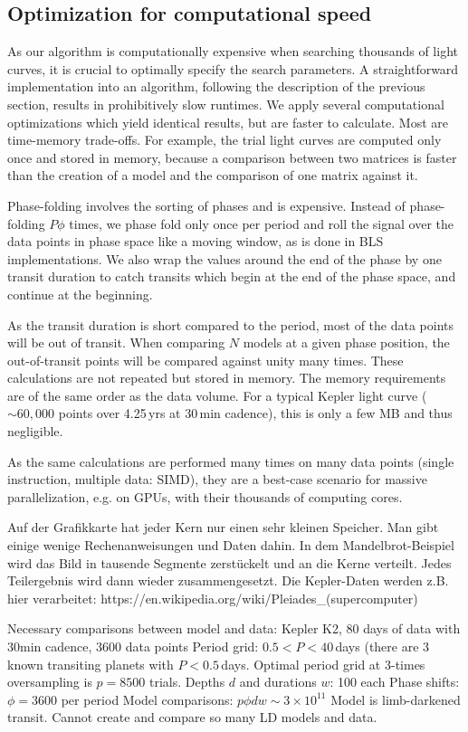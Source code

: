 \documentclass[twocolumn,tighten,longauthor]{myaastex62}
\begin{document}
\subsection{Optimization for computational speed}
As our algorithm is computationally expensive when searching thousands of light curves, it is crucial to optimally specify the search parameters.
A straightforward implementation into an algorithm, following the description of the previous section, results in prohibitively slow runtimes. We apply several computational optimizations which yield identical results, but are faster to calculate. Most are time-memory trade-offs. For example, the trial light curves are computed only once and stored in memory, because a comparison between two matrices is faster than the creation of a model and the comparison of one matrix against it.

Phase-folding involves the sorting of phases and is expensive. Instead of phase-folding $P \phi$ times, we phase fold only once per period and roll the signal over the data points in phase space like a moving window, as is done in BLS implementations. We also wrap the values around the end of the phase by one transit duration to catch transits which begin at the end of the phase space, and continue at the beginning.

As the transit duration is short compared to the period, most of the data points will be out of transit. When comparing $N$ models at a given phase position, the out-of-transit points will be compared against unity many times. These calculations are not repeated but stored in memory. The memory requirements are of the same order as the data volume. For a typical Kepler light curve ($\sim60{,}000$ points over 4.25\,yrs at 30\,min cadence), this is only a few MB and thus negligible.

As the same calculations are performed many times on many data points (single instruction, multiple data: SIMD), they are a best-case scenario for massive parallelization, e.g. on GPUs, with their thousands of computing cores.

Auf der Grafikkarte hat jeder Kern nur einen sehr kleinen Speicher. Man gibt einige wenige Rechenanweisungen und Daten dahin. In dem Mandelbrot-Beispiel wird das Bild in tausende Segmente zerstückelt und an die Kerne verteilt. Jedes Teilergebnis wird dann wieder zusammengesetzt.
Die Kepler-Daten werden z.B. hier verarbeitet: https://en.wikipedia.org/wiki/Pleiades_(supercomputer)

Necessary comparisons between model and data:
Kepler K2, 80 days of data with 30min cadence, 3600 data points
Period grid: $0.5<P<40\,$days (there are 3 known transiting planets with $P<0.5\,$days. Optimal period grid at 3-times oversampling is $p=8500$ trials.
Depths $d$ and durations $w$: 100 each
Phase shifts: $\phi=3600$ per period
Model comparisons: $p \phi d w \sim 3\times10^{11}$
Model is limb-darkened transit. Cannot create and compare so many LD models and data.
\end{document}
